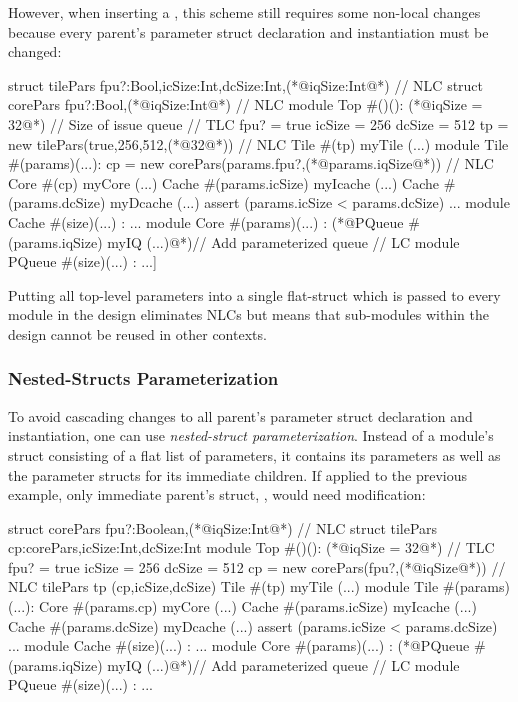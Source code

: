 However, when inserting a , this scheme still requires some non-local changes because every parent's parameter struct declaration and instantiation must be changed:

\begin{phdl}
struct tilePars {fpu?:Bool,icSize:Int,dcSize:Int,(*@\textcolor[rgb]{1,0,0}{iqSize:Int}@*)}     // NLC
struct corePars {fpu?:Bool,(*@\textcolor[rgb]{1,0,0}{iqSize:Int}@*)}                           // NLC
module Top #()():
  (*@\textcolor[rgb]{1,0,0}{iqSize = 32}@*)  // Size of issue queue                            // TLC
  fpu? = true
  icSize = 256
  dcSize = 512
  tp = new tilePars(true,256,512,(*@\textcolor[rgb]{1,0,0}{32}@*))                             // NLC
  Tile #(tp) myTile (...)
module Tile #(params)(...):
  cp = new corePars(params.fpu?,(*@\textcolor[rgb]{1,0,0}{params.iqSize}@*))                   // NLC
  Core  #(cp)  myCore   (...)
  Cache #(params.icSize) myIcache (...)
  Cache #(params.dcSize) myDcache (...)
  assert (params.icSize < params.dcSize) ...
module Cache #(size)(...) : ...
module Core #(params)(...) :
    (*@\textcolor[rgb]{1,0,0}{PQueue \#(params.iqSize) myIQ (...)}@*)// Add parameterized queue // LC
module PQueue #(size)(...) : ...]
\end{phdl} 

Putting all top-level parameters into a single flat-struct which is passed to every module in the design
eliminates NLCs but means that sub-modules within the design cannot be reused in other contexts.

\subsubsection{Nested-Structs Parameterization}

To avoid cascading changes to all parent's parameter struct declaration and instantiation, one can use \emph{nested-struct parameterization}. Instead of a module's struct consisting of a flat list of parameters, it contains its parameters as well as the parameter structs for its immediate children. If applied to the previous example, only  immediate parent's struct, , would need modification:

\begin{phdl}
struct corePars {fpu?:Boolean,(*@\textcolor[rgb]{1,0,0}{iqSize:Int}@*)}                        // NLC
struct tilePars {cp:corePars,icSize:Int,dcSize:Int}
module Top #()():
  (*@\textcolor[rgb]{1,0,0}{iqSize = 32}@*)                                                    // TLC
  fpu? = true
  icSize = 256
  dcSize = 512
  cp = new corePars(fpu?,(*@\textcolor[rgb]{1,0,0}{iqSize}@*))                                 // NLC
  tilePars tp (cp,icSize,dcSize)
  Tile #(tp) myTile (...)
module Tile #(params)(...):
  Core  #(params.cp)  myCore   (...)
  Cache #(params.icSize) myIcache (...)
  Cache #(params.dcSize) myDcache (...)
  assert (params.icSize < params.dcSize) ...
module Cache #(size)(...) : ...
module Core #(params)(...) :
    (*@\textcolor[rgb]{1,0,0}{PQueue \#(params.iqSize) myIQ (...)}@*)// Add parameterized queue // LC
module PQueue #(size)(...) : ...
\end{phdl} 

